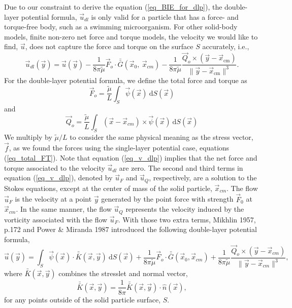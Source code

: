 Due to our constraint to derive the equation (\ref{eq_BIE_for_dlp}), the double-layer potential formula, $\vec{u}_{dl}$ is only valid for a particle that has a force- and torque-free body, such as a swimming microorganism.
For other solid-body models, finite non-zero net force and torque models, the velocity we would like to find, $\vec{u}$, does not capture the force and torque on the surface $S$ accurately, i.e., 
\begin{equation}
\vec{u}_{dl}(\vec{y}) = \vec{u}(\vec{y}) 
- \frac{1}{8 \pi \tilde{\mu} }\vec{F}_o \cdot \bar{\bar{G}}(\vec{x}_{0}, \ \vec{x}_{cm})
- \frac{1}{8 \pi \tilde{\mu} } \frac{\vec{Q}_o \times  (\vec{y}   - \vec{x}_{\text{cm}} ) }{\| \vec{y}   - \vec{x}_{\text{cm}} \|^3 }.
\label{eq_v_dlp}
\end{equation}
For the double-layer potential formula, we define the total force and torque as
\begin{equation}
 \vec{F}_o
  = \frac{\tilde{\mu}}{L} \int_S \vec{\psi}(\vec{x}) \  \text{d}S(\vec{x})
 \label{alpha_dl}
 \end{equation} 
 and
 \begin{equation}
 \vec{Q}_o 
 = \frac{\tilde{\mu}}{L} \int_S (\vec{x} - \vec{x}_{cm}) \times \vec{\psi}(\vec{x})  \ \text{d}S(\vec{x})
 \label{omega_dl}
 \end{equation}
%
We multiply by $\tilde{\mu} / L$ to consider the same physical meaning as the stress vector, $\vec{f}$, as we found the forces using the single-layer potential case, equations (\ref{eq_total_FT}).
Note that equation (\ref{eq_v_dlp}) implies that the net force and torque associated to the velocity $\vec{u}_{dl}$ are zero.
The second and third terms in equation (\ref{eq_v_dlp}), denoted by $\vec{u}_F$ and $\vec{u}_Q$, respectively, are a solution to the Stokes equations, except at the center of mass of the solid particle, $\vec{x}_{cm}$.
The flow $\vec{u}_F$ is the velocity at a point $\vec{y}$ generated by the point force with strength $\vec{F}_0$ at $\vec{x}_{cm}$. 
In the same manner, the flow $\vec{u}_Q$ represents the velocity induced by the vorticity associated with the flow $\vec{u}_F$.
With those two extra terms, Mikhlin 1957, p.172 \cite{smithies_integral_1959} and Power \& Miranda 1987 \cite{power_second_1987} introduced the following double-layer potential formula,
\begin{equation}
\vec{u}(\vec{y}) = \int_S
\vec{\psi}(\vec{x}) \cdot  \bar{\bar{K}}(\vec{x},\vec{y})  \ \text{d}S(\vec{x}) + 
\frac{1}{8 \pi \tilde{\mu} }\vec{F}_o \cdot \bar{\bar{G}}(\vec{x}_{0},\vec{x}_{cm})
+\frac{1}{8 \pi \tilde{\mu} } \frac{\vec{Q}_o \times  (\vec{y}   - \vec{x}_{cm} ) }{\| \vec{y}   - \vec{x}_{cm} \|^3 },
 \label{eq_BI_DL}
\end{equation}
where $ \bar{\bar{K}}(\vec{x},\vec{y})$ combines the stresslet and normal vector,
\begin{equation*}
	\bar{\bar{K}}(\vec{x},\vec{y})
	= \frac{1}{8 \pi} \bar{\bar{K}}(\vec{x},\vec{y})  \cdot \hat{n}(\vec{x}),
\end{equation*}
for any points outside of the solid particle surface, $S$.

